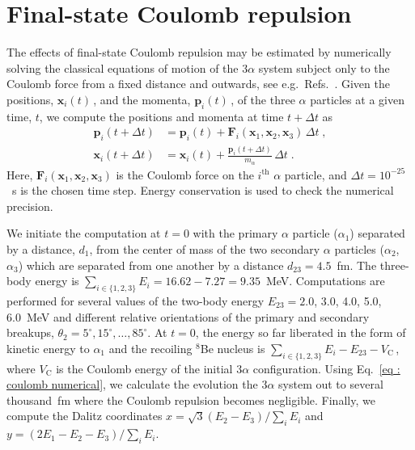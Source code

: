 \section{Final-state Coulomb repulsion}
The effects of final-state Coulomb repulsion may be estimated by numerically solving the classical equations of motion of the $3\alpha$ system subject only to the Coulomb force from a fixed distance and outwards, see e.g.\ Refs.~\cite{norbeck68,thompson72}. Given the positions, $\boldsymbol{x}_i(t)\,$, and the momenta, $\boldsymbol{p}_i(t)\,$, of the three $\alpha$ particles at a given time, $t$, we compute the positions and momenta at time $t+\Delta t$ as 
\begin{align}\label{eq : coulomb numerical}
\boldsymbol{p}_i(t+\Delta t) &= \boldsymbol{p}_i(t) + \boldsymbol{F}_i(\boldsymbol{x}_1,\boldsymbol{x}_2,\boldsymbol{x}_3) \, \Delta t \nonumber \; , \\
\boldsymbol{x}_i(t+\Delta t) &= \boldsymbol{x}_i(t) + \frac{\boldsymbol{p}_i(t+\Delta t)}{m_{\alpha}} \, \Delta t \; .
\end{align}
Here, $\boldsymbol{F}_i(\boldsymbol{x}_1,\boldsymbol{x}_2,\boldsymbol{x}_3)$ is the Coulomb force on the $i^{\textrm{th}}$ $\alpha$ particle, and $\Delta t=10^{-25}$~s is the chosen time step. Energy conservation is used to check the numerical precision. 

We initiate the computation at $t=0$ with the primary $\alpha$ particle ($\alpha_1$) separated by a distance, $d_{1}$, from the center of mass of the two secondary $\alpha$ particles ($\alpha_2$, $\alpha_3$) which are 
separated from one another by a distance $d_{23}=4.5$~fm. The 
three-body energy is $\sum_{i\in\{1,2,3\}} E_{i} = 16.62-7.27 = 9.35$~MeV. 
Computations are performed for several values of the two-body 
energy $E_{23} = 2.0$, 3.0, 4.0, 5.0, 6.0~MeV and different relative orientations of the primary and secondary breakups, $\theta_2 = 5^{\circ}, 15^{\circ}, \dots, 85^{\circ}$. %
At $t=0$, the energy so far liberated in the form of kinetic energy to $\alpha_1$ and the recoiling $^8$Be nucleus is $\sum_{i\in\{1,2,3\}} E_{i} - E_{23} - V_{\textrm{C}}\,$, where $V_{\textrm{C}}$ is the Coulomb energy of the initial $3\alpha$ configuration. Using Eq.~\ref{eq : coulomb numerical}, we calculate the evolution the $3\alpha$ system out to several thousand~fm where the Coulomb repulsion becomes negligible. Finally, we compute the Dalitz coordinates $x = \sqrt{3} (E_2 - E_3) / \sum_{i} E_{i}$ and $y = (2 E_1 - E_2 - E_3) / \sum_{i} E_{i}$. 

